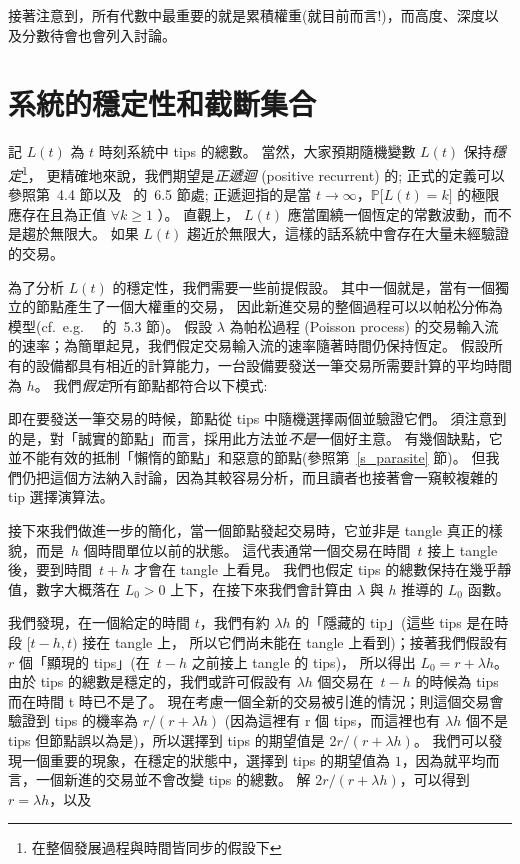 \documentclass[12pt]{article}
\begin{document}
\begin{CJK}{UTF8}{bkai}
接著注意到，所有代數中最重要的就是累積權重(就目前而言!)，而高度、深度以及分數待會也會列入討論。


\section{系統的穩定性和截斷集合}
\label{s_cutsets}

記 $L(t)$ 為 $t$ 時刻系統中 tips 的總數。
當然，大家預期隨機變數 $L(t)$ 保持\emph{穩定}\footnote{在整個發展過程與時間皆同步的假設下}，
更精確地來說，我們期望是\emph{正遞迴} (positive recurrent) 的; 
正式的定義可以參照第~4.4 節以及~\cite{Ross_m} 的~6.5 節處; 
正遞迴指的是當 $t\to\infty$，$\mathbb{P}\big[L(t)=k\big]$ 的極限應存在且為正值 $\forall k\geq 1$ ）。
直觀上， $L(t)$ 應當圍繞一個恆定的常數波動，而不是趨於無限大。
如果 $L(t)$ 趨近於無限大，這樣的話系統中會存在大量未經驗證的交易。

為了分析 $L(t)$ 的穩定性，我們需要一些前提假設。
其中一個就是，當有一個獨立的節點產生了一個大權重的交易，
因此新進交易的整個過程可以以帕松分佈為模型(cf.\ e.g.\ ~\cite{Ross_m} 的~5.3 節)。
假設 $\lambda$ 為帕松過程 (Poisson process) 的交易輸入流的速率；為簡單起見，我們假定交易輸入流的速率隨著時間仍保持恆定。
假設所有的設備都具有相近的計算能力，一台設備要發送一筆交易所需要計算的平均時間為 $h$。
我們\emph{假定}所有節點都符合以下模式:
 
即在要發送一筆交易的時候，節點從 tips 中隨機選擇兩個並驗證它們。
須注意到的是，對「誠實的節點」而言，採用此方法並\emph{不是}一個好主意。
有幾個缺點，它並不能有效的抵制「懶惰的節點」和惡意的節點(參照第~\ref{s_parasite} 節)。
但我們仍把這個方法納入討論，因為其較容易分析，而且讀者也接著會一窺較複雜的 tip 選擇演算法。

接下來我們做進一步的簡化，當一個節點發起交易時，它並非是 tangle 真正的樣貌，而是~$h$ 個時間單位以前的狀態。
這代表通常一個交易在時間~$t$ 接上 tangle 後，要到時間~$t+h$ 才會在 tangle 上看見。
我們也假定 tips 的總數保持在幾乎靜值，數字大概落在 $L_0>0$ 上下，在接下來我們會計算由 $\lambda$ 與 $h$ 推導的 $L_0$ 函數。

我們發現，在一個給定的時間 $t$，我們有約 $\lambda h$ 的「隱藏的 tip」(這些 tips 是在時段 $[t-h,t)$ 接在 tangle 上，
所以它們尚未能在 tangle 上看到)；接著我們假設有 $r$ 個「顯現的 tips」(在~$t-h$ 之前接上 tangle 的 tips)，
所以得出 $L_0=r+\lambda h$。由於 tips 的總數是穩定的，我們或許可假設有 $\lambda h$ 個交易在~$t-h$ 的時候為 tips 而在時間 t 時已不是了。
現在考慮一個全新的交易被引進的情況；則這個交易會驗證到 tips 的機率為 $r/(r+\lambda h)$
(因為這裡有 r 個 tips，而這裡也有 $\lambda h$ 個不是 tips 但節點誤以為是)，所以選擇到 tips 的期望值是 $2r/(r+\lambda h)$。
我們可以發現一個重要的現象，在穩定的狀態中，選擇到 tips 的期望值為 $1$，因為就平均而言，一個新進的交易並不會改變 tips 的總數。
解 $2r/(r+\lambda h)$，可以得到 $r=\lambda h$，以及
 

\end{CJK}
\end{document}
